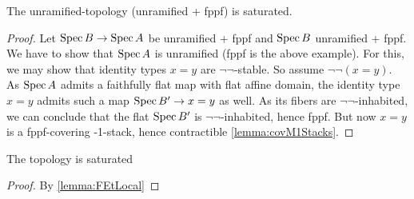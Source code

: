 \begin{example}
	The unramified-topology (unramified + fppf) is saturated.
\end{example}
\begin{proof}
	Let $\operatorname{Spec} B \to \operatorname{Spec} A$ be unramified + fppf and $\operatorname{Spec} B$ unramified + fppf. We have to show that $\operatorname{Spec} A$ is unramified (fppf is the above example). For this, we may show that identity types $x = y$ are $\lnot \lnot$-stable. So assume $\lnot \lnot (x = y).$\\
	As $\operatorname{Spec} A$ admits a faithfully flat map with flat affine domain, the identity type $x = y$ admits such a map $\operatorname{Spec} B' \to x = y$ as well. As its fibers are $\lnot \lnot$-inhabited, we can conclude that the flat $\operatorname{Spec} B'$ is $\lnot \lnot $-inhabited, hence fppf. But now $x = y$ is a fppf-covering -1-stack, hence contractible \ref{lemma:covM1Stacks}.
\end{proof}

\begin{lemma}
	The \etale topology is saturated
\end{lemma}
\begin{proof}
	By \ref{lemma:FEtLocal}
\end{proof}
%
%
%
%


